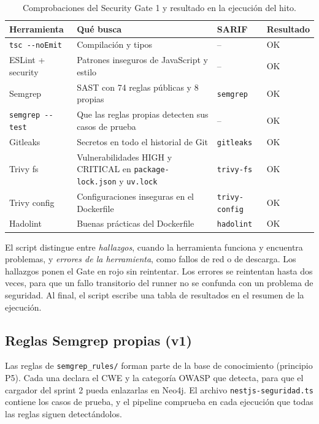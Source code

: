\documentclass[11pt,a4paper]{report}
\begin{document}
\begin{table}[H]
\centering
\caption{Comprobaciones del Security Gate 1 y resultado en la ejecución del hito.}
\begin{tabularx}{\textwidth}{@{}P{3.3cm}LP{2.4cm}P{2.0cm}@{}}
\toprule
\textbf{Herramienta} & \textbf{Qué busca} & \textbf{SARIF} & \textbf{Resultado}\\
\midrule
\texttt{tsc -{}-noEmit} & Compilación y tipos & -- & OK\\
ESLint + security & Patrones inseguros de JavaScript y estilo & -- & OK\\
Semgrep & SAST con 74 reglas públicas y 8 propias & \texttt{semgrep} & OK\\
\texttt{semgrep -{}-test} & Que las reglas propias detecten sus casos de prueba & -- & OK\\
Gitleaks & Secretos en todo el historial de Git & \texttt{gitleaks} & OK\\
Trivy fs & Vulnerabilidades HIGH y CRITICAL en \texttt{package-lock.json} y \texttt{uv.lock} & \texttt{trivy-fs} & OK\\
Trivy config & Configuraciones inseguras en el Dockerfile & \texttt{trivy-config} & OK\\
Hadolint & Buenas prácticas del Dockerfile & \texttt{hadolint} & OK\\
\bottomrule
\end{tabularx}
\end{table}

El script distingue entre \emph{hallazgos}, cuando la herramienta funciona y encuentra problemas,
y \emph{errores de la herramienta}, como fallos de red o de descarga. Los hallazgos ponen el Gate
en rojo sin reintentar. Los errores se reintentan hasta dos veces, para que un fallo transitorio
del runner no se confunda con un problema de seguridad. Al final, el script escribe una tabla de
resultados en el resumen de la ejecución.

\subsection{Reglas Semgrep propias (v1)}
Las reglas de \texttt{semgrep\_rules/} forman parte de la base de conocimiento (principio P5). Cada
una declara el CWE y la categoría OWASP que detecta, para que el cargador del sprint 2 pueda
enlazarlas en Neo4j. El archivo \texttt{nestjs-seguridad.ts} contiene los casos de prueba, y el
pipeline comprueba en cada ejecución que todas las reglas siguen detectándolos.
\end{document}
